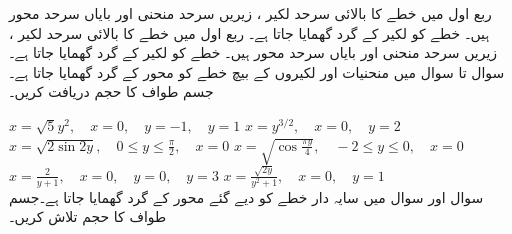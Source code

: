 ربع اول میں خطے کا بالائی سرحد لکیر ، زیریں سرحد منحنی  اور بایاں سرحد محور  ہیں۔ خطے کو لکیر  کے گرد گھمایا جاتا ہے۔
ربع اول میں خطے کا بالائی سرحد لکیر ، زیریں سرحد منحنی  اور بایاں سرحد محور  ہیں۔ خطے کو لکیر  کے گرد گھمایا جاتا ہے۔
سوال  تا سوال  میں منحنیات اور لکیروں کے بیچ خطے کو  محور کے گرد گھمایا جاتا ہے۔ جسم طواف کا حجم دریافت کریں۔

$x=\sqrt{5}y^2,\quad x=0,\quad y=-1,\quad y=1$
$x=y^{3/2},\quad x=0,\quad y=2$
$x=\sqrt{2\sin 2y},\quad 0\le y\le \tfrac{\pi}{2},\quad x=0$
$x=\sqrt{\cos\tfrac{\pi y}{4}},\quad -2\le y\le 0,\quad x=0$
$x=\tfrac{2}{y+1},\quad x=0,\quad y=0,\quad y=3$
$x=\tfrac{\sqrt{2y}}{y^2+1},\quad x=0,\quad y=1$
\\
سوال  اور سوال  میں سایہ دار خطے کو دیے گئے محور کے گرد گھمایا جاتا ہے۔جسم طواف کا حجم تلاش کریں۔

